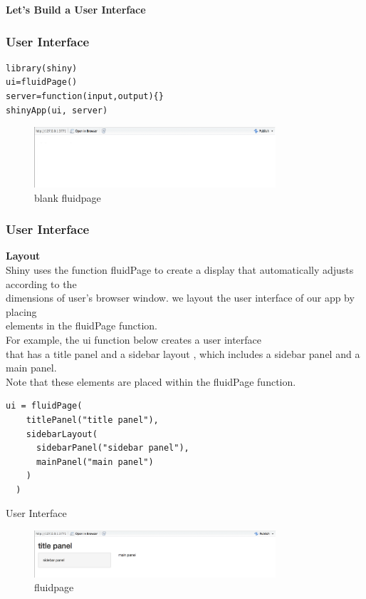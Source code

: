 \documentclass[aspectratio=169,serif,professionalfont]{beamer}
\begin{document}


\begin{frame}[fragile]
  \textbf{ Let's Build a User Interface }
  \frametitle{User Interface}
\begin{verbatim}
library(shiny)
ui=fluidPage()
server=function(input,output){}
shinyApp(ui, server)
\end{verbatim}
\begin{figure}[htbp]
    \centering
    \includegraphics[width=0.8\textwidth]{blank_fluidpage.png}
    \caption{blank fluidpage}
    \label{fig:image_label1}
\end{figure}
\end{frame}

\begin{frame}[fragile]
 \frametitle{User Interface} 
\textbf{Layout}\\
Shiny uses the function fluidPage to create a display that automatically adjusts according to the\\ dimensions of user's browser window. we layout the user interface of our app by placing \\elements in the fluidPage function. \\For example, the ui function below creates a user interface \\that has a title panel and a sidebar layout , which includes a sidebar panel and a main panel. \\Note that these elements are placed within the fluidPage function.
\begin{verbatim}
ui = fluidPage(
    titlePanel("title panel"),
    sidebarLayout(
      sidebarPanel("sidebar panel"),
      mainPanel("main panel")
    )
  )            

\end{verbatim}
\end{frame}
\begin{frame}{User Interface}
    \begin{figure}[htbp]
    \centering
    \includegraphics[width=0.8\textwidth]{fluidpage.png}
    \caption{fluidpage}
    \label{fig:image_label2}
\end{figure}
\end{frame}
\end{document}
